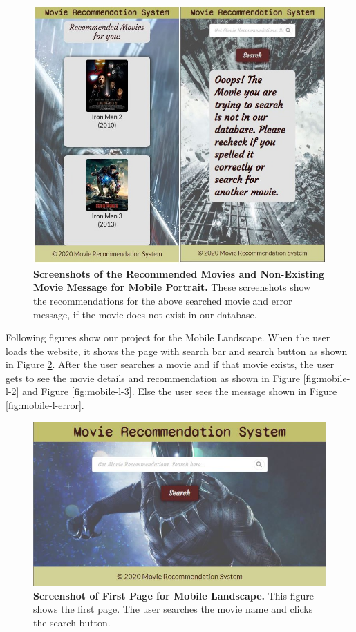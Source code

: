 \begin{figure}[ht]
	\centering
  	\includegraphics[width=1.0\textwidth]{images/mobile_p_2.JPG}
	\caption{\textbf{Screenshots of the Recommended Movies and Non-Existing Movie Message for Mobile Portrait.} These screenshots show the recommendations for the above searched movie and error message, if the movie does not exist in our database.}
  	\label{fig:mobile-p-2}
\end{figure}

Following figures show our project for the Mobile Landscape. When the user loads the website, it shows the page with search bar and search button as shown in Figure \ref{fig:mobile-l-1}. After the user searches a movie and if that movie exists, the user gets to see the movie details and recommendation as shown in Figure \ref{fig:mobile-l-2} and Figure \ref{fig:mobile-l-3}. Else the user sees the message shown in Figure \ref{fig:mobile-l-error}.

\begin{figure}[ht]
	\centering
  	\includegraphics[width=1.0\textwidth]{images/mobile_l_1.JPG}
	\caption{\textbf{Screenshot of First Page for Mobile Landscape.} This figure shows the first page. The user searches the movie name and clicks the search button.}
  	\label{fig:mobile-l-1}
\end{figure}

